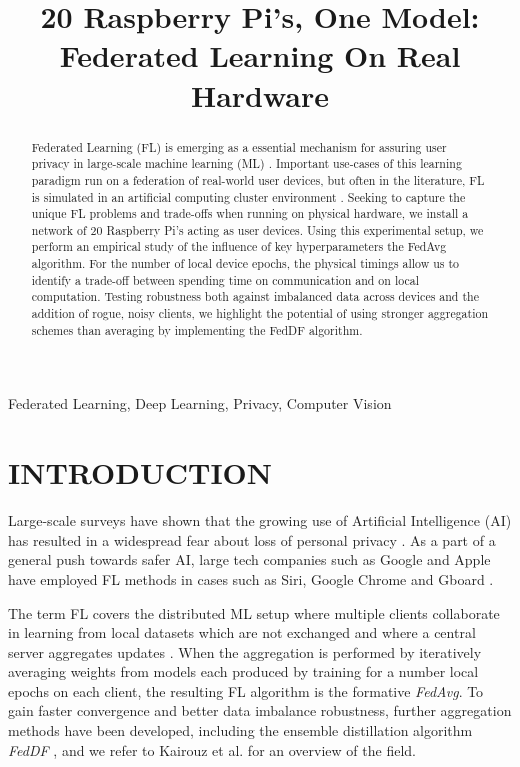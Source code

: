 \documentclass{article}
\title{20 Raspberry Pi's, One Model: Federated Learning On Real Hardware}
\begin{document}
%

\maketitle
%
\begin{abstract}
    Federated Learning (FL) is emerging as a essential mechanism for assuring user privacy in large-scale machine learning (ML) \cite{kai2021advances}.
    Important use-cases of this learning paradigm run on a federation of real-world user devices, but often in the literature, FL is simulated in an artificial computing cluster environment \cite{kai2021advances,mcmahan2017communication,lin2020ensemble}.
    Seeking to capture the unique FL problems and trade-offs when running on physical hardware, we install a network of 20 Raspberry Pi's acting as user devices.
    Using this experimental setup, we perform an empirical study of the influence of key hyperparameters the FedAvg \cite{mcmahan2017communication} algorithm.
    For the number of local device epochs, the physical timings allow us to identify a trade-off between spending time on communication and on local computation.
    Testing robustness both against imbalanced data across devices and the addition of rogue, noisy clients, we highlight the potential of using stronger aggregation schemes than averaging by implementing the FedDF \cite{lin2020ensemble} algorithm.
\end{abstract}
%
\begin{keywords}
    Federated Learning, Deep Learning, Privacy, Computer Vision
\end{keywords}

\section{INTRODUCTION}
\label{sec:intro}
Large-scale surveys have shown that the growing use of Artificial Intelligence (AI) has resulted in a widespread fear about loss of personal privacy \cite{beuc2020consumers, west2018survey}.
As a part of a general push towards safer AI, large tech companies such as Google and Apple have employed FL methods in cases such as Siri, Google Chrome and Gboard \cite{kai2021advances}.

The term FL covers the distributed ML setup where multiple clients collaborate in learning from local datasets which are not exchanged and where a central server aggregates updates \cite{kai2021advances, mcmahan2017communication}.
When the aggregation is performed by iteratively averaging weights from models each produced by training for a number local epochs on each client, the resulting FL algorithm is the formative \emph{FedAvg}\cite{mcmahan2017communication}.
To gain faster convergence and better data imbalance robustness, further aggregation methods have been developed, including the ensemble distillation algorithm \emph{FedDF} \cite{lin2020ensemble}, and we refer to Kairouz et al. for an overview of the field\cite{kai2021advances}.
\end{document}
